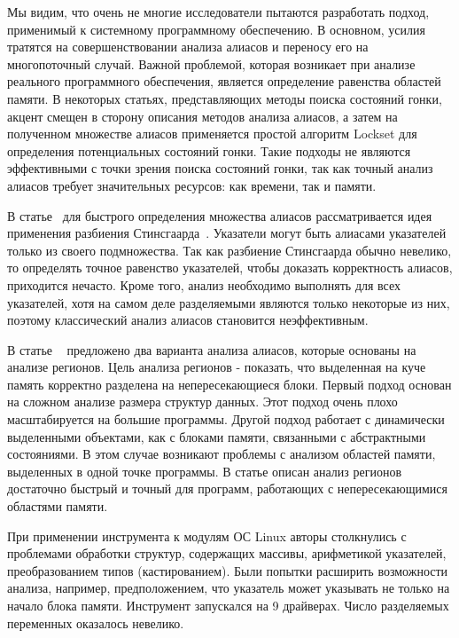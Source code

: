 Мы видим, что очень не многие исследователи пытаются разработать подход, применимый к системному программному обеспечению. 
В основном, усилия тратятся на совершенствовании анализа алиасов и переносу его на многопоточный случай.
Важной проблемой, которая возникает при анализе реального программного обеспечения, является определение равенства областей памяти.
В некоторых статьях, представляющих методы поиска состояний гонки, акцент смещен в сторону описания методов анализа алиасов, а затем на полученном множестве алиасов применяется простой алгоритм Lockset для определения потенциальных состояний гонки. 
Такие подходы не являются эффективными с точки зрения поиска состояний гонки, так как точный анализ алиасов требует значительных ресурсов: как времени, так и памяти.

В статье~\cite{Kahlon:2009:SDR} для быстрого определения множества алиасов рассматривается идея применения разбиения Стинсгаарда~\cite{Steensgaard:1996}. 
Указатели могут быть алиасами указателей только из своего подмножества.
Так как разбиение Стинсгаарда обычно невелико, то определять точное равенство указателей, чтобы доказать корректность алиасов, приходится нечасто.
Кроме того, анализ необходимо выполнять для всех указателей, хотя на самом деле разделяемыми являются только некоторые из них, поэтому классический анализ алиасов становится неэффективным.

В статье ~\cite{Seidl:2009} предложено два варианта анализа алиасов, которые основаны на анализе регионов.
Цель анализа регионов - показать, что выделенная на куче память корректно разделена на непересекающиеся блоки.
Первый подход основан на сложном анализе размера структур данных. Этот подход очень плохо масштабируется на большие программы.
Другой подход работает с динамически выделенными объектами, как с блоками памяти, связанными с абстрактными состояниями.
В этом случае возникают проблемы с анализом областей памяти, выделенных в одной точке программы.
В статье описан анализ регионов достаточно быстрый и точный для программ, работающих с непересекающимися областями памяти.

При применении инструмента к модулям ОС Linux авторы столкнулись с проблемами обработки структур, содержащих массивы, арифметикой указателей, преобразованием типов (кастированием).
Были попытки расширить возможности анализа, например, предположением, что указатель может указывать не только на начало блока памяти. 
Инструмент запускался на 9 драйверах. Число разделяемых переменных оказалось невелико.

